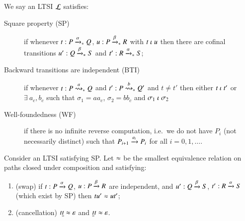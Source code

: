 
\begin{definition}\label{def:basic}
  We say an LTSI $\mathcal{L}$ satisfies:
  \begin{description}
  \item[Square property (SP)] if whenever $t:P \xrightarrow[]{\alpha}_{*} Q$, $u:P
    \xrightarrow[]{\beta}_{*} R$ with $t \mathrel{\iota} u$ then there are cofinal transitions
    $u': Q \xrightarrow[]{\beta}_{*} S$ and $t':R \xrightarrow[]{\alpha}_{*} S$;%
  \item[Backward transitions are independent (BTI)] if whenever $t:P \stackrel{a}{\rightsquigarrow}_{*}
    Q$ and $t': P \stackrel{b}{\rightsquigarrow}_{*} Q'$ 
    and $t \neq t'$ then either $t \mathrel{\iota} t'$ or $\exists~a_c, b_c$ such that
    $\sigma_1= aa_c$, $\sigma_2 = bb_c$ and $\sigma_1 \mathrel{\iota} \sigma_2$
  \item[Well-foundedness (WF)] if there is no infinite reverse
    computation, i.e.\ we do not have $P_i$ (not necessarily distinct)
    such that $P_{i+1} \xrightarrow[]{a_i} P_i$ for all $i = 0,1,\ldots$.
  \end{description}
\end{definition}

\begin{definition}\label{def:ceqt}
  Consider an LTSI satisfying SP.
  Let $\approx$ be the smallest equivalence relation on paths closed under composition and satisfying:
  \begin{enumerate}
  \item
    (swap)  
    if $t:P \xrightarrow[]{\alpha} Q$, $u:P \xrightarrow[]{\beta} R$ are independent,
    and $u': Q \xrightarrow[]{\beta} S$, $t':R \xrightarrow[]{\alpha} S$ (which exist by SP)
    then $tu' \approx ut'$;
  \item
    (cancellation)
    $t \underline{t} \approx \varepsilon$ \quad and \quad $\underline{t} t \approx \varepsilon$.
  \end{enumerate}
\end{definition}